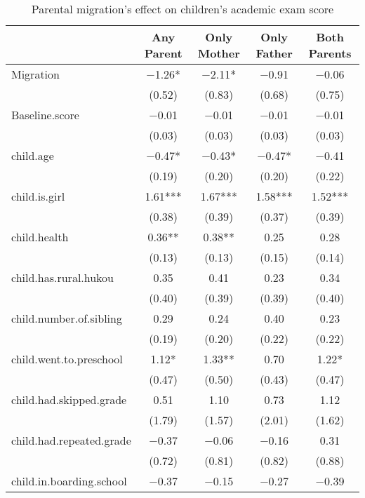 \documentclass[
  man,floatsintext]{apa7}
\begin{document}
\begin{table}

\caption{Parental migration’s effect on children’s academic exam score}
\centering
\begin{tabular}[t]{lcccc}
\toprule
  & Any Parent & Only Mother & Only Father & Both Parents\\
\midrule
Migration & \num{-1.26}* & \num{-2.11}* & \num{-0.91} & \num{-0.06}\\
 & (\num{0.52}) & (\num{0.83}) & (\num{0.68}) & (\num{0.75})\\
Baseline.score & \num{-0.01} & \num{-0.01} & \num{-0.01} & \num{-0.01}\\
 & (\num{0.03}) & (\num{0.03}) & (\num{0.03}) & (\num{0.03})\\
child.age & \num{-0.47}* & \num{-0.43}* & \num{-0.47}* & \num{-0.41}\\
 & (\num{0.19}) & (\num{0.20}) & (\num{0.20}) & (\num{0.22})\\
child.is.girl & \num{1.61}*** & \num{1.67}*** & \num{1.58}*** & \num{1.52}***\\
 & (\num{0.38}) & (\num{0.39}) & (\num{0.37}) & (\num{0.39})\\
child.health & \num{0.36}** & \num{0.38}** & \num{0.25} & \num{0.28}\\
 & (\num{0.13}) & (\num{0.13}) & (\num{0.15}) & (\num{0.14})\\
child.has.rural.hukou & \num{0.35} & \num{0.41} & \num{0.23} & \num{0.34}\\
 & (\num{0.40}) & (\num{0.39}) & (\num{0.39}) & (\num{0.40})\\
child.number.of.sibling & \num{0.29} & \num{0.24} & \num{0.40} & \num{0.23}\\
 & (\num{0.19}) & (\num{0.20}) & (\num{0.22}) & (\num{0.22})\\
child.went.to.preschool & \num{1.12}* & \num{1.33}** & \num{0.70} & \num{1.22}*\\
 & (\num{0.47}) & (\num{0.50}) & (\num{0.43}) & (\num{0.47})\\
child.had.skipped.grade & \num{0.51} & \num{1.10} & \num{0.73} & \num{1.12}\\
 & (\num{1.79}) & (\num{1.57}) & (\num{2.01}) & (\num{1.62})\\
child.had.repeated.grade & \num{-0.37} & \num{-0.06} & \num{-0.16} & \num{0.31}\\
 & (\num{0.72}) & (\num{0.81}) & (\num{0.82}) & (\num{0.88})\\
child.in.boarding.school & \num{-0.37} & \num{-0.15} & \num{-0.27} & \num{-0.39}\\

\end{tabular}
\end{table}
\end{document}

